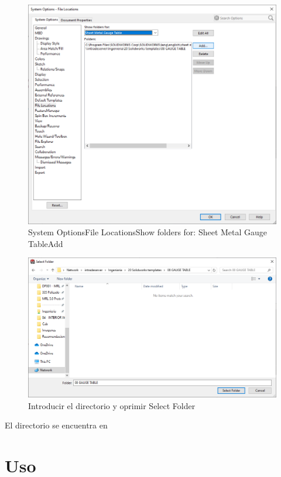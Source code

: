 \documentclass{report}
\begin{document}
\begin{figure}[H]
	\centering
	\includegraphics[width=0.85\linewidth, height=0.5\textheight,keepaspectratio]{Imagenes/solidworks_sheetmetalgauge_02}
	\caption{System Options\textrightarrow File Locations\textrightarrow Show folders for: Sheet Metal Gauge Table\textrightarrow Add}
	\label{fig:solidworkssheetmetalgauge02}
\end{figure}

\begin{figure}[H]
	\centering
	\includegraphics[width=0.85\linewidth, height=0.5\textheight,keepaspectratio]{Imagenes/solidworks_sheetmetalgauge_03}
	\caption{Introducir el directorio y oprimir Select Folder}
	\label{fig:solidworkssheetmetalgauge03}
\end{figure}

El directorio se encuentra en 

\section{Uso}
\end{document}

